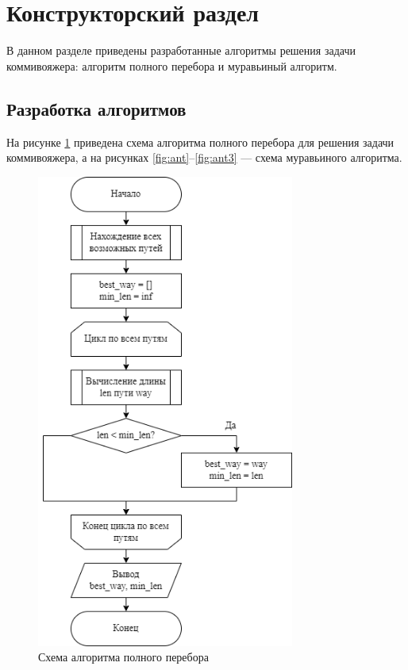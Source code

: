 \section{Конструкторский раздел \hfill}
\vspace{\baselineskip}

В данном разделе приведены разработанные алгоритмы решения задачи коммивояжера: алгоритм полного перебора и муравьиный алгоритм.

\vspace{\baselineskip}
\subsection{Разработка алгоритмов} 
\vspace{\baselineskip}

На рисунке \ref{fig:full} приведена схема алгоритма полного перебора для решения задачи коммивояжера, а на рисунках \ref{fig:ant}--\ref{fig:ant3} --- схема муравьиного алгоритма.

\begin{figure}[h!btp]
	\centering
	\includegraphics[width=240pt]{inc/scheme_full_search.png}
	\caption{Схема алгоритма полного перебора}
	\label{fig:full}	
\end{figure}

